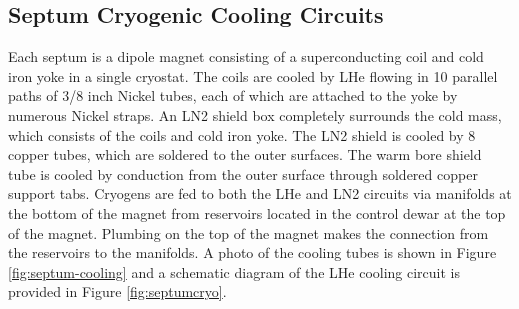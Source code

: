 {\subsection {\bf Septum Cryogenic Cooling Circuits}
Each septum is a dipole magnet consisting of a superconducting coil and cold iron yoke in 
a single cryostat.  The coils are cooled by LHe flowing in 10 parallel paths of 3/8 inch Nickel 
tubes, each of which are attached to the yoke by numerous Nickel straps. An LN2 shield  box 
completely surrounds the cold mass, which consists of the coils and cold iron yoke.  
The LN2 shield is cooled by 8 copper tubes, which are soldered to the outer surfaces.  
The warm bore shield tube is cooled by conduction from the outer surface through soldered copper 
support tabs. Cryogens are fed to both the LHe and LN2 circuits via manifolds at the bottom of 
the magnet from reservoirs located in the control dewar at the top of the magnet.  Plumbing on 
the top of the magnet makes the connection from the reservoirs to the manifolds.  A photo of the 
cooling tubes is shown in Figure \ref{fig:septum-cooling} and a schematic diagram of the LHe cooling circuit 
is provided in Figure \ref{fig:septumcryo}.
}


